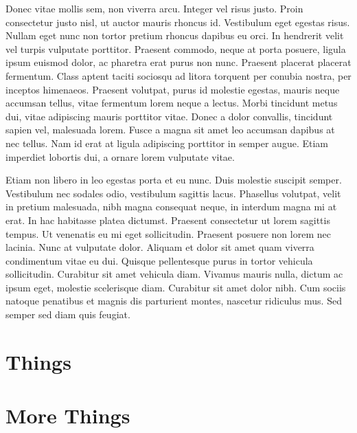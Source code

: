 \documentclass[double,12pt]{beavtex}
\begin{document}
Donec vitae mollis sem, non viverra arcu. Integer vel risus justo. Proin consectetur justo nisl, ut auctor mauris rhoncus id. Vestibulum eget egestas risus. Nullam eget nunc non tortor pretium rhoncus dapibus eu orci. In hendrerit velit vel turpis vulputate porttitor. Praesent commodo, neque at porta posuere, ligula ipsum euismod dolor, ac pharetra erat purus non nunc. Praesent placerat placerat fermentum. Class aptent taciti sociosqu ad litora torquent per conubia nostra, per inceptos himenaeos. Praesent volutpat, purus id molestie egestas, mauris neque accumsan tellus, vitae fermentum lorem neque a lectus. Morbi tincidunt metus dui, vitae adipiscing mauris porttitor vitae. Donec a dolor convallis, tincidunt sapien vel, malesuada lorem. Fusce a magna sit amet leo accumsan dapibus at nec tellus. Nam id erat at ligula adipiscing porttitor in semper augue. Etiam imperdiet lobortis dui, a ornare lorem vulputate vitae. 

Etiam non libero in leo egestas porta et eu nunc. Duis molestie suscipit semper. Vestibulum nec sodales odio, vestibulum sagittis lacus. Phasellus volutpat, velit in pretium malesuada, nibh magna consequat neque, in interdum magna mi at erat. In hac habitasse platea dictumst. Praesent consectetur ut lorem sagittis tempus. Ut venenatis eu mi eget sollicitudin. Praesent posuere non lorem nec lacinia. Nunc at vulputate dolor. Aliquam et dolor sit amet quam viverra condimentum vitae eu dui. Quisque pellentesque purus in tortor vehicula sollicitudin. Curabitur sit amet vehicula diam. Vivamus mauris nulla, dictum ac ipsum eget, molestie scelerisque diam. Curabitur sit amet dolor nibh. Cum sociis natoque penatibus et magnis dis parturient montes, nascetur ridiculus mus. Sed semper sed diam quis feugiat. 

\pagebreak




\pagebreak

\appendix

\chapter{Things}





\chapter{More Things}
\end{document}
